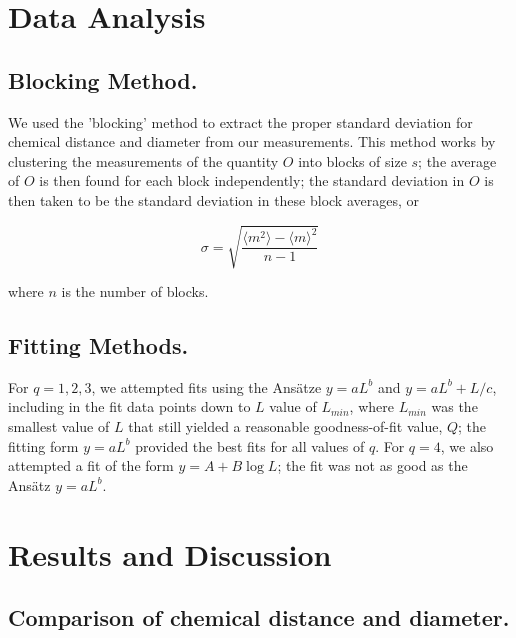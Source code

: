 \documentclass[pre,preprint,11pt]{revtex4}
\newcommand{\lb}{{\langle}}
\newcommand{\rb}{{\rangle}}
\begin{document}
\section{Data Analysis}

\subsection{ Blocking Method.}

 We used the 'blocking' method \cite{NeBa99} to extract the proper standard deviation for chemical distance and diameter from our measurements.  This method works by clustering the measurements of the quantity $O$ into blocks of size $s$; the average of $O$ is then found for each block independently;  the standard deviation in $O$ is then taken to be the standard deviation in these block averages, or

\begin {equation}
\sigma=\sqrt{ \frac{\lb m^2 \rb - \lb m \rb ^2}{n-1}}
\end {equation}

where $n$ is the number of blocks. 


\subsection{ Fitting Methods.}
For $q=1,2,3$, we attempted fits using the Ans\"{a}tze $y=aL^b$ and $y=aL^b+L/c$, including in the fit data points down to $L$ value of $L_{min}$, where $L_{min}$ was the smallest value of $L$ that still yielded a reasonable goodness-of-fit value, $Q$;  the fitting form $y=aL^b$ provided the best fits for all values of $q$.  For $q=4$, we also attempted a fit of the form $y=A+B \log L$; the fit was not as good as the Ans\"{a}tz $y=aL^b$.



\section{Results and Discussion}


\subsection{ Comparison of chemical distance and diameter.}  
\end{document}
